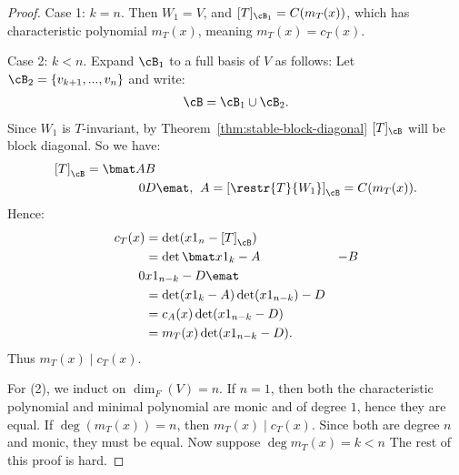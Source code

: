 \begin{proof}
            Case 1: $k = n$. Then $W_1 = V$, and $[T]_{\cB_1} = C(m_T(x))$, which has characteristic polynomial $m_T(x)$, meaning $m_T(x) = c_T(x)$.

            Case 2: $k < n$. Expand $\cB_1$ to a full basis of $V$ as follows: Let $\cB_2 = \{v_{k+1},...,v_n\}$ and write:
                \begin{equation*}
                \begin{split}
                    \cB = \cB_1 \cup \cB_2.
                \end{split}
                \end{equation*}
            Since $W_1$ is $T$-invariant,  by Theorem~\ref{thm:stable-block-diagonal} $[T]_\cB$ will be block diagonal. So we have:
                \begin{equation*}
                \begin{split}
                    \left[T\right]_\cB = \bmat A & B \\ 0 & D \emat, \hspace{4pt} A = \left[\restr{T}{W_1}\right]_\cB = C(m_T(x)).
                \end{split}
                \end{equation*}
            Hence:
                \begin{equation*}
                \begin{split}
                    c_T(x)
                    & = \det(x1_n - \left[T\right]_\cB) \\
                    & = \det \bmat x1_k - A & -B \\ 0 & x1_{n-k}-D \emat \\
                    & = \det(x1_k - A)\det(x1_{n-k})-D \\
                    & = c_A(x)\det(x1_{n-k}-D) \\
                    & = m_T(x)\det(x1_{n-k}-D).
                \end{split}
                \end{equation*}
            Thus $m_T(x) \mid c_T(x)$.

            For (2), we induct on $\dim_F(V) = n$. If $n = 1$, then both the characteristic polynomial and minimal polynomial are monic and of degree $1$, hence they are equal. If $\deg{(m_T(x))} = n$, then $m_T(x) \mid c_T(x)$. Since both are degree $n$ and monic, they must be equal. Now suppose $\deg{m_T(x)} = k < n$ {\color{red}  The rest of this proof is hard}.
        \end{proof}

